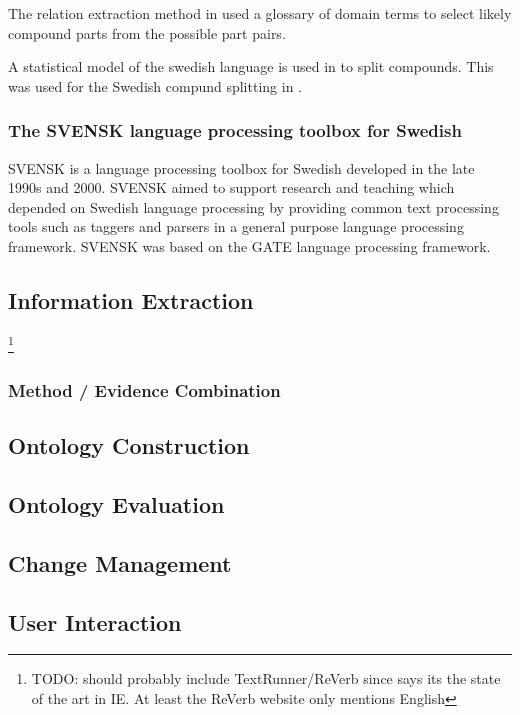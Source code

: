 \documentclass[a4paper]{report}
\newcommand{\todo}[1]{\footnote{{\color{red} TODO: #1}}}
\begin{document}
The relation extraction method in \cite{Kokkinakis08SolidComp} used a glossary of domain terms to select likely compound parts from the possible part pairs.

A statistical model of the swedish language is used in \citep{Sjobergh04Compounds} to split compounds. This was used for the Swedish compund splitting in \citep{Hjelm09Thesis}.

\subsubsection{The SVENSK language processing toolbox for Swedish}

SVENSK is a language processing toolbox for Swedish developed in the late 1990s and 2000\cite{OlssonGamback00SVENSK}. SVENSK aimed to support research and teaching which depended on Swedish language processing by providing common text processing tools such as taggers and parsers in a general purpose language processing framework. SVENSK was based on the GATE language processing framework.

\subsection{Information Extraction}

\todo{should probably include TextRunner/ReVerb since \cite{Poon2010OntoUSP} says its the state of the art in IE. At least the ReVerb website only mentions English}

\subsubsection{Method / Evidence Combination}

\subsection{Ontology Construction}

\subsection{Ontology Evaluation}

\subsection{Change Management}

\subsection{User Interaction}
\end{document}

